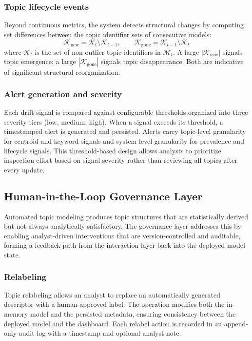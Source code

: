 \documentclass[conference]{IEEEtran}
\begin{document}
\subsubsection{Topic lifecycle events}
Beyond continuous metrics, the system detects structural changes by computing set differences between the topic identifier sets of consecutive models:
\begin{equation}
\label{eq:lifecycle}
    \mathcal{K}_{\mathrm{new}} = \mathcal{K}_t \setminus \mathcal{K}_{t-1}, \qquad
    \mathcal{K}_{\mathrm{gone}} = \mathcal{K}_{t-1} \setminus \mathcal{K}_t
\end{equation}
where $\mathcal{K}_t$ is the set of non-outlier topic identifiers in $\mathcal{M}_t$. A large $|\mathcal{K}_{\mathrm{new}}|$ signals topic emergence; a large $|\mathcal{K}_{\mathrm{gone}}|$ signals topic disappearance. Both are indicative of significant structural reorganization.

\subsubsection{Alert generation and severity}
Each drift signal is compared against configurable thresholds organized into three severity tiers (low, medium, high). When a signal exceeds its threshold, a timestamped alert is generated and persisted. Alerts carry topic-level granularity for centroid and keyword signals and system-level granularity for prevalence and lifecycle signals. This threshold-based design allows analysts to prioritize inspection effort based on signal severity rather than reviewing all topics after every update.

\subsection{Human-in-the-Loop Governance Layer}
Automated topic modeling produces topic structures that are statistically derived but not always analytically satisfactory. The governance layer addresses this by enabling analyst-driven interventions that are version-controlled and auditable, forming a feedback path from the interaction layer back into the deployed model state.

\subsubsection{Relabeling}
Topic relabeling allows an analyst to replace an automatically generated descriptor with a human-approved label. The operation modifies both the in-memory model and the persisted metadata, ensuring consistency between the deployed model and the dashboard. Each relabel action is recorded in an append-only audit log with a timestamp and optional analyst note.
\end{document}
